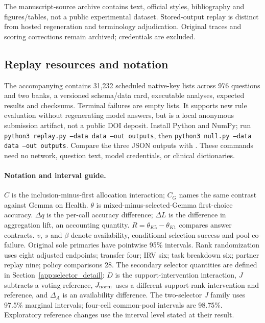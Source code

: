 The manuscript-source archive contains text, official styles, bibliography and figures/tables, not a public experimental dataset. Stored-output replay is distinct from hosted regeneration and terminology adjudication. Original traces and scoring corrections remain archived; credentials are excluded.

\subsection{Replay resources and notation}\label{app:reader_card}

The accompanying  contains 31,232 scheduled native-key lists across 976 questions and two banks, a versioned schema/data card, executable analyses, expected results and checksums. Terminal failures are empty lists. It supports new rule evaluation without regenerating model answers, but is a local anonymous submission artifact, not a public DOI deposit. Install Python and NumPy; run \texttt{python3 replay.py --data data --out outputs}, then \texttt{python3 null.py --data data --out outputs}. Compare the three JSON outputs with . These commands need no network, question text, model credentials, or clinical dictionaries.

\paragraph{Notation and interval guide.}
$C$ is the inclusion-minus-first allocation interaction; $C_G$ names the same contrast against Gemma on Health. $\theta$ is mixed-minus-selected-Gemma first-choice accuracy. $\Delta q$ is the per-call accuracy difference; $\Delta L$ is the difference in aggregation lift, an accounting quantity. $R=\theta_{K5}-\theta_{K1}$ compares answer contracts. $v$, $s$ and $\beta$ denote availability, conditional selection success and pool co-failure. Original sole primaries have pointwise 95\% intervals. Rank randomization uses eight adjusted endpoints; transfer four; IRV six; task breakdown six; partner replay nine; policy comparisons 28. The secondary selector quantities are defined in Section~\ref{app:selector_detail}: $D$ is the support-intervention interaction, $J$ subtracts a voting reference, $J_{\rm norm}$ uses a different support-rank intervention and reference, and $\Delta_A$ is an availability difference. The two-selector $J$ family uses 97.5\% marginal intervals; four-cell common-pool intervals are 98.75\%. Exploratory reference changes use the interval level stated at their result.

